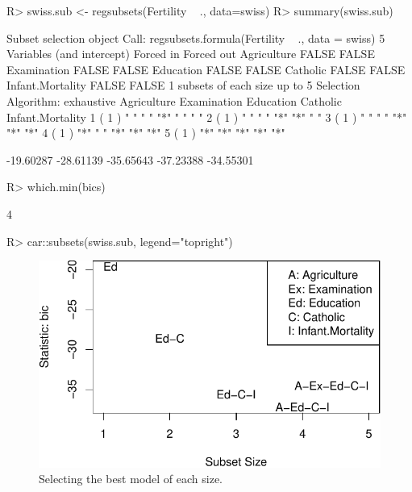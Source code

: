 \documentclass[
]{jss}
\begin{document}
\begin{CodeChunk}
\begin{CodeInput}
R> swiss.sub <- regsubsets(Fertility ~ ., data=swiss)
R> summary(swiss.sub)
\end{CodeInput}
\begin{CodeOutput}
Subset selection object
Call: regsubsets.formula(Fertility ~ ., data = swiss)
5 Variables  (and intercept)
                 Forced in Forced out
Agriculture          FALSE      FALSE
Examination          FALSE      FALSE
Education            FALSE      FALSE
Catholic             FALSE      FALSE
Infant.Mortality     FALSE      FALSE
1 subsets of each size up to 5
Selection Algorithm: exhaustive
         Agriculture Examination Education Catholic Infant.Mortality
1  ( 1 ) " "         " "         "*"       " "      " "             
2  ( 1 ) " "         " "         "*"       "*"      " "             
3  ( 1 ) " "         " "         "*"       "*"      "*"             
4  ( 1 ) "*"         " "         "*"       "*"      "*"             
5  ( 1 ) "*"         "*"         "*"       "*"      "*"             
\end{CodeOutput}
\begin{CodeOutput}
[1] -19.60287 -28.61139 -35.65643 -37.23388 -34.55301
\end{CodeOutput}
\begin{CodeInput}
R> which.min(bics)
\end{CodeInput}
\begin{CodeOutput}
[1] 4
\end{CodeOutput}
\begin{CodeInput}
R> car::subsets(swiss.sub, legend="topright")
\end{CodeInput}
\begin{figure}

{\centering \includegraphics{JSS-article_files/figure-latex/subset-selection-1} 

}

\caption[Selecting the best model of each size]{Selecting the best model of each size.}\label{fig:subset-selection}
\end{figure}
\end{CodeChunk}
\end{document}
